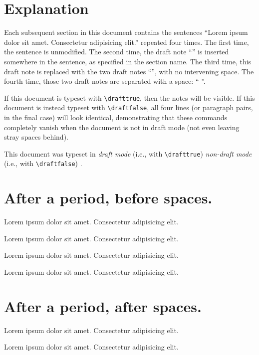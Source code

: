 \documentclass[12pt]{article}
\begin{document}
\section*{Explanation}

Each subsequent section in this document contains the sentences ``Lorem ipsum
dolor sit amet.  Consectetur adipisicing elit.'' repeated four times.  The first
time, the sentence is unmodified.  The second time, the draft note
``'' is inserted somewhere in the sentence, as
specified in the section name.  The third time, this draft note is replaced with
the two draft notes
``'', with no
intervening space.  The fourth time, those two draft notes are separated with a
space: `` ''.

If this document is typeset with \verb+\drafttrue+, then the notes will be
visible.  If this document is instead typeset with \verb+\draftfalse+, all four
lines (or paragraph pairs, in the final case) will look identical, demonstrating
that these commands completely vanish when the document is not in draft mode
(not even leaving stray spaces behind).

This document was typeset in
\ifdraft
  \emph{draft mode} (i.e., with \verb+\drafttrue+)%
\else
  \emph{non-draft mode} (i.e., with \verb+\draftfalse+)%
\fi
.

\parindent=0pt

\section*{After a period, before spaces.}

Lorem ipsum dolor sit amet.  Consectetur adipisicing elit.

Lorem ipsum dolor sit amet.  Consectetur adipisicing elit.

Lorem ipsum dolor sit amet.  Consectetur adipisicing elit.

Lorem ipsum dolor sit amet.   Consectetur adipisicing elit.

\section*{After a period, after spaces.}

Lorem ipsum dolor sit amet.  Consectetur adipisicing elit.

Lorem ipsum dolor sit amet.  Consectetur adipisicing elit.
\end{document}
